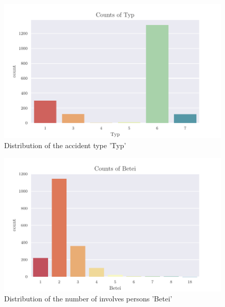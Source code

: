 \documentclass[a4paper,headsepline,footsepline,fontsize=11pt,BCOR=12mm,DIV=12]{report}
\begin{document}
\begin{appendices}
\begin{figure}[h]
	\centering
	\includegraphics[scale=1]{../CorrAnalysis/data/BAYSIS/02_matched/plots/baysis_matched_count_Typ}
	\caption{Distribution of the accident type 'Typ'}
	\label{img:appendix_baysis_matched_Typ}
\end{figure}

\begin{figure}[h]
	\centering
	\includegraphics[scale=1]{../CorrAnalysis/data/BAYSIS/02_matched/plots/baysis_matched_count_Betei}
	\caption{Distribution of the number of involves persons 'Betei'}
	\label{img:appendix_baysis_matched_Beteil}
\end{figure}


\end{appendices}
\end{document}
